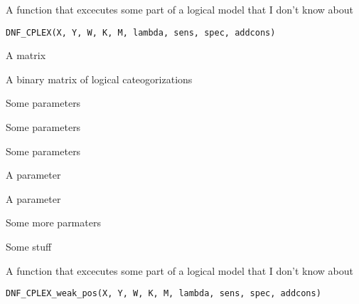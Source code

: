 \documentclass[letterpaper]{book}
\begin{document}
%
\begin{Description}\relax
A function that excecutes some part of a logical model that I don't know about
\end{Description}
%
\begin{Usage}
\begin{verbatim}
DNF_CPLEX(X, Y, W, K, M, lambda, sens, spec, addcons)
\end{verbatim}
\end{Usage}
%
\begin{Arguments}
\begin{ldescription}
\item[\code{X}] A matrix

\item[\code{Y}] A binary matrix of logical cateogorizations

\item[\code{W}] Some parameters

\item[\code{K}] Some parameters

\item[\code{M}] Some parameters

\item[\code{lambda}] A parameter

\item[\code{sens}] A parameter

\item[\code{spec}] Some more parmaters

\item[\code{addcons}] Some stuff
\end{ldescription}
\end{Arguments}
%
\begin{Description}\relax
A function that excecutes some part of a logical model that I don't know about
\end{Description}
%
\begin{Usage}
\begin{verbatim}
DNF_CPLEX_weak_pos(X, Y, W, K, M, lambda, sens, spec, addcons)
\end{verbatim}
\end{Usage}
%
\end{document}

